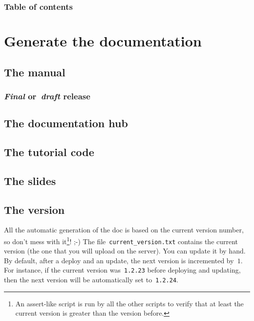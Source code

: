 \documentclass[a4paper,10pt]{article}
\begin{document}
\subsubsection{Table of contents}

\section{Generate the documentation}
\label{generate_documentation}

\subsection{The manual}

\subsubsection{\emph{Final} or~\emph{draft} release}
\label{final_draft_mode}

\subsection{The documentation hub}
\label{generate_documentation_hub}

\subsection{The tutorial code}

\subsection{The slides}

\subsection{The version}
All the automatic generation of the doc is based on the current version number, so don't mess with it\footnote{An assert-like script is run by all the other scripts to verify that at least the current version is
greater than the version before.}! ;-) 
The file~\verb+current_version.txt+ contains the current version (the one that you will upload on the server). You can update it by hand. By default, after a deploy and an update, the next version is incremented by~$1$. For instance, if the current version was~\verb+1.2.23+ before deploying and updating, then the next version will be automatically set to~\verb+1.2.24+.\\
\end{document}

